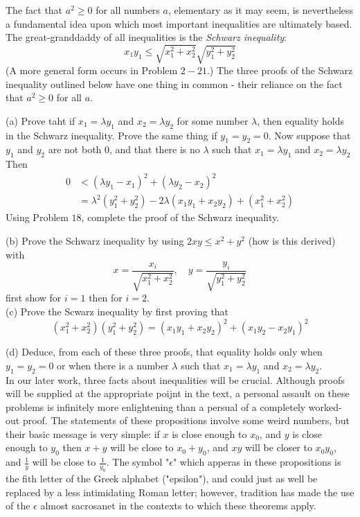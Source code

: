 \begin{tcolorbox}[title=Problem 19, breakable]
    The fact that $a^2 \ge 0$ for all numbers $a$, elementary as it may seem,
    is nevertheless a fundamental idea upon which most important inequalities
    are ultimately based. The great-granddaddy of all inequalities is the 
    \emph{Schwarz inequality}:
    \[x_1 y_1 \le \sqrt{x_1^2 + x_2^2} \sqrt{y_1^2 + y_2^2}\]
    (A more general form occurs in Problem $2-21$.) The three proofs of the 
    Schwarz inequality outlined below have one thing in common - their 
    reliance on the fact that $a^2 \ge 0$ for all $a$.

    (a) Prove taht if $x_1 = \lambda y_1$ and $x_2 = \lambda y_2$ for some 
    number $\lambda$, then equality holds in the Schwarz inequality.
    Prove the same thing if $y_1 = y_2 = 0$.
    Now suppose that $y_1$ and $y_2$ are not both $0$, and that there is no 
    $\lambda$ such that $x_1 = \lambda y_1$ and $x_2 = \lambda y_2$ Then 
    \begin{align*}
        0 &< (\lambda y_1 - x_1)^2 + (\lambda y_2 - x_2)^2 \\
        &=\lambda^2(y_1^2 + y_2^2) - 2 \lambda (x_1 y_1  + x_2 y_2) + (x_1^2 + x_2^2)
    \end{align*}
    Using Problem $18$, complete the proof of the Schwarz inequality.

    (b) Prove the Schwarz inequality by using $2xy \le x^2 + y^2$ (how is 
    this derived) with
    \[x = \frac{x_i}{\sqrt{x_1^2 + x_2^2}}, \quad y = \frac{y_i}{\sqrt{y_1^2 + y_2^2}}\]
    first show for $i = 1$ then for $i = 2$. \\

    (c) Prove the Scwarz inequality by first proving that 
    \[(x_1^2 + x_2^2)(y_1^2 + y_2^2) = (x_1 y_1 + x_2 y_2)^2 + (x_1 y_2 - x_2 y_1)^2\]

    (d) Deduce, from each of these three proofs, that equality holds only when 
    $y_1 = y_2 = 0$ or when there is a number $\lambda$ such that $x_1 = \lambda y_1$ and 
    $x_2 = \lambda y_2$. \\

    In our later work, three facts about inequalities will be crucial. Although proofs 
    will be supplied at the appropriate poijnt in the text, a personal assault on these 
    problems is infinitely more enlightening than a persual of a completely worked-out 
    proof. The statements of these propositions involve some weird numbers, but their 
    basic message is very simple: if $x$ is close enough to $x_0$, and $y$ is close enough
    to $y_0$ then $x + y$ will be close to $x_0 + y_0$, and $xy$ will be closer 
    to $x_0 y_0$, and $\frac{1}{y}$ will be close to $\frac{1}{y_0}$. The symbol
    "$\epsilon$" which apperas in these propositions is the fith letter of the Greek 
    alphabet ("epsilon"), and could just as well be replaced by a less intimidating 
    Roman letter; however, tradition has made the use of the $\epsilon$ almost sacrosanet
    in the contexts to which these theorems apply.
\end{tcolorbox}

